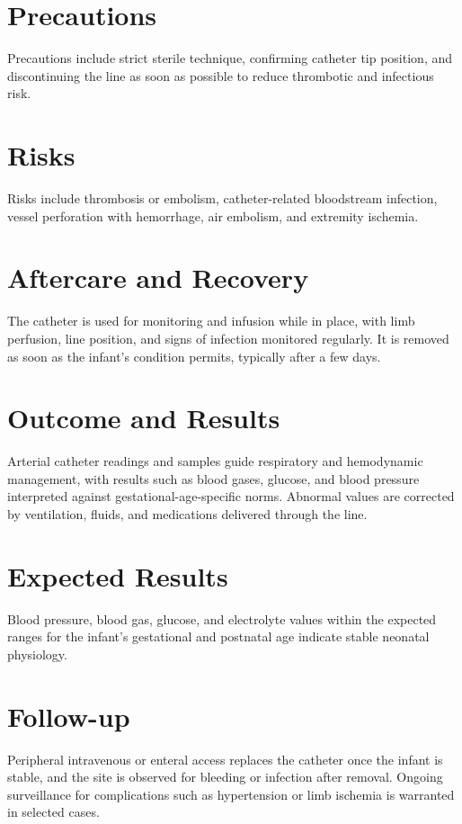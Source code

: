 \section*{Precautions}
Precautions include strict sterile technique, confirming catheter tip position, and discontinuing the line as soon as possible to reduce thrombotic and infectious risk.

\section*{Risks}
Risks include thrombosis or embolism, catheter-related bloodstream infection, vessel perforation with hemorrhage, air embolism, and extremity ischemia.

\section*{Aftercare and Recovery}
The catheter is used for monitoring and infusion while in place, with limb perfusion, line position, and signs of infection monitored regularly. It is removed as soon as the infant's condition permits, typically after a few days.

\section*{Outcome and Results}
Arterial catheter readings and samples guide respiratory and hemodynamic management, with results such as blood gases, glucose, and blood pressure interpreted against gestational-age-specific norms. Abnormal values are corrected by ventilation, fluids, and medications delivered through the line.

\section*{Expected Results}
Blood pressure, blood gas, glucose, and electrolyte values within the expected ranges for the infant's gestational and postnatal age indicate stable neonatal physiology.

\section*{Follow-up}
Peripheral intravenous or enteral access replaces the catheter once the infant is stable, and the site is observed for bleeding or infection after removal. Ongoing surveillance for complications such as hypertension or limb ischemia is warranted in selected cases.

